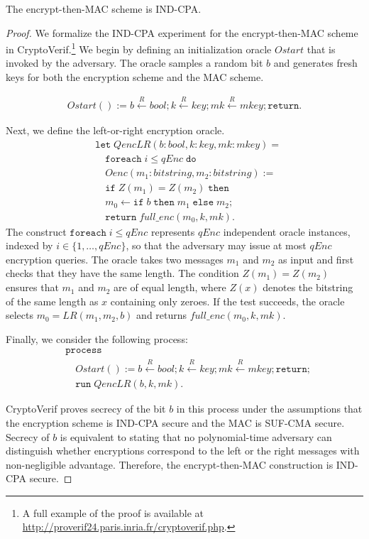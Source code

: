 \begin{theorem}
The encrypt-then-MAC scheme is IND-CPA.
\end{theorem}

\begin{proof}
We formalize the IND-CPA experiment for the encrypt-then-MAC scheme in CryptoVerif.\footnote{A full example of the proof is available at \href{http://proverif24.paris.inria.fr/cryptoverif.php}{http://proverif24.paris.inria.fr/cryptoverif.php}.} We begin by defining an initialization oracle $Ostart$ that is invoked by the adversary. The oracle samples a random bit $b$ and generates fresh keys for both the encryption scheme and the MAC scheme.

\begin{align*}
Ostart() := b \xleftarrow{R} bool; k \xleftarrow{R} key; mk \xleftarrow{R} mkey; \mathbf{\mathtt{return}}.
\end{align*}

Next, we define the left-or-right encryption oracle.
\begin{align*}
&\mathbf{\mathtt{let}}\; QencLR(b:\mathit{bool}, k:\mathit{key}, mk:\mathit{mkey}) = \\
&\quad \mathbf{\mathtt{foreach}}\; i \leq qEnc\; \mathbf{\mathtt{do}} \\
&\quad Oenc(m_1:\mathit{bitstring}, m_2:\mathit{bitstring}) := \\
&\quad \mathbf{\mathtt{if}}\; Z(m_1) = Z(m_2)\; \mathbf{\mathtt{then}} \\
&\quad m_0 \leftarrow \mathbf{\mathtt{if}}\; b\; \mathbf{\mathtt{then}}\; m_1\; \mathbf{\mathtt{else}}\; m_2; \\
&\quad \mathbf{\mathtt{return}}\; full\_enc(m_0,k,mk).
\end{align*}
The construct $\mathbf{\mathtt{foreach}}\; i \leq qEnc$ represents $qEnc$ independent oracle instances, indexed by $i \in \{1,\dots,qEnc\}$, so that the adversary may issue at most $qEnc$ encryption queries. 
The oracle takes two messages $m_1$ and $m_2$ as input and first checks that they have the same length. 
The condition $Z(m_1)=Z(m_2)$ ensures that $m_1$ and $m_2$ are of equal length, where $Z(x)$ denotes the bitstring of the same length as $x$ containing only zeroes. 
If the test succeeds, the oracle selects $m_0 = LR(m_1,m_2,b)$ and returns $full\_enc(m_0,k,mk)$.

Finally, we consider the following process:
\begin{align*}
&\mathtt{process} \\
&\quad Ostart() := b \xleftarrow{R} bool; k \xleftarrow{R} key; mk \xleftarrow{R} mkey; \mathbf{\mathtt{return}}; \\
&\quad \mathtt{run}\; QencLR(b, k, mk).
\end{align*}

CryptoVerif proves secrecy of the bit $b$ in this process under the assumptions that the encryption scheme is IND-CPA secure and the MAC is SUF-CMA secure. 
Secrecy of $b$ is equivalent to stating that no polynomial-time adversary can distinguish whether encryptions correspond to the left or the right messages with non-negligible advantage. Therefore, the encrypt-then-MAC construction is IND-CPA secure. 
\end{proof}


